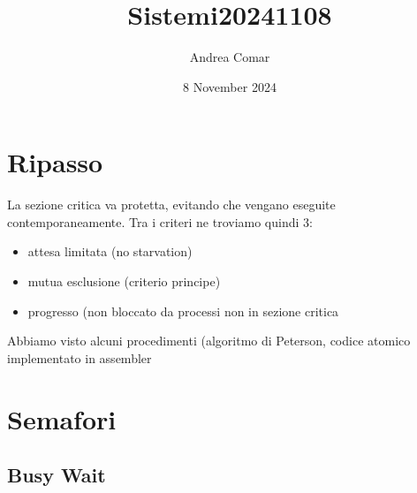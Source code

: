 \documentclass{article}
\title{Sistemi20241108}
\author{Andrea Comar}
\date{8 November 2024}
\begin{document}
\maketitle

\section{Ripasso}
La sezione critica va protetta, evitando che vengano eseguite contemporaneamente. Tra i criteri ne troviamo quindi 3:
\begin{itemize}
    \item attesa limitata (no starvation)
    \item mutua esclusione (criterio principe)
    \item progresso (non bloccato da processi non in sezione critica
\end{itemize}
Abbiamo visto alcuni procedimenti (algoritmo di Peterson, codice atomico implementato in assembler
\section{Semafori}
\subsection{Busy Wait}
\end{document}
